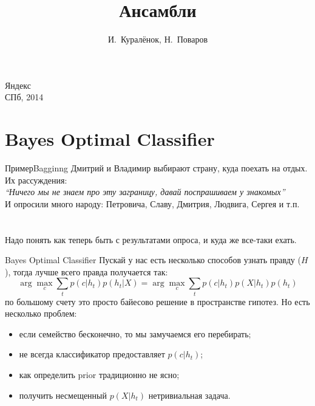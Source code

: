 \documentclass[14pt, fleqn, xcolor={dvipsnames, table}]{beamer}
\title{Ансамбли\\\small{}}
\author[]{\small{%
И.~Куралёнок,
Н.~Поваров}}
\date{}
\begin{document}
\begin{frame}
\maketitle
\small
\begin{center}
\vspace{-60pt}
\normalsize {\color{red}Я}ндекс \\
\vspace{80pt}
\footnotesize СПб, 2014
\end{center}
\end{frame}

\section{Bayes Optimal Classifier}
\begin{frame}{Пример}{Bagginng}
Дмитрий и Владимир выбирают страну, куда поехать на отдых. Их рассуждения: \\
\textit{``Ничего мы не знаем про эту заграницу, давай поспрашиваем у знакомых''} \\
И опросили много народу: Петровича, Славу, Дмитрия, Людвига, Сергея и т.п.\\
~\\
~\\
Надо понять как теперь быть с результатами опроса, и куда же все-таки ехать.
\end{frame}

\begin{frame}{Bayes Optimal Classifier}
Пускай у нас есть несколько способов узнать правду ($H$), тогда лучше всего правда получается так:
{\small
$$
\arg \max_c \sum_t p(c|h_t) p(h_t | X) = \arg \max_c \sum_t p(c|h_t) p(X | h_t) p(h_t) 
$$
}
по большому счету это просто байесово решение в пространстве гипотез. Но есть несколько проблем:
\small
\begin{itemize}
  \item если семейство бесконечно, то мы замучаемся его перебирать;
  \item не всегда классификатор предоставляет $p(c|h_t)$;
  \item как определить prior традиционно не ясно;
  \item получить несмещенный $p(X|h_t)$ нетривиальная задача.
\end{itemize}
\end{frame}
\end{document}
